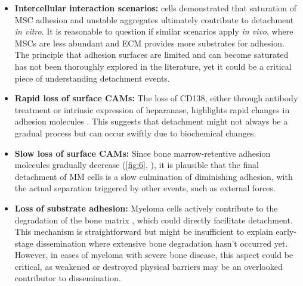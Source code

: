 \begin{itemize}

      \item\textbf{Intercellular interaction scenarios:} \INA cells demonstrated
            that saturation of MSC adhesion and unstable aggregates ultimately
            contribute to detachment \textit{in vitro}. It is reasonable to
            question if similar scenarios apply \textit{in vivo}, where MSCs are
            less abundant and ECM provides more substrates for adhesion. The
            principle that adhesion surfaces are limited and can become
            saturated has not been thoroughly explored in the literature, yet it
            could be a critical piece of understanding detachment events.

      \item\textbf{Rapid loss of surface \acp{CAM}:} The loss of CD138, either
            through antibody treatment or intrinsic expression of heparanase,
            highlights rapid changes in adhesion molecules
            \cite{yangHeparanasePromotesSpontaneous2005,
                  akhmetzyanovaDynamicCD138Surface2020}. This suggests that detachment
            might not always be a gradual process but can occur swiftly due to
            biochemical changes.

      \item\textbf{Slow loss of surface \acp{CAM}:} Since bone marrow-retentive
            adhesion molecules gradually decrease (\autoref{fig:6},
            ), it is plausible that the final detachment of MM
            cells is a slow culmination of diminishing adhesion, with the actual
            separation triggered by other events, such as external forces.

      \item\textbf{Loss of substrate adhesion:} Myeloma cells actively
            contribute to the degradation of the bone matrix
            \cite{terposPathogenesisBoneDisease2018}, which could directly
            facilitate detachment. This mechanism is straightforward but might
            be insufficient to explain early-stage dissemination where extensive
            bone degradation hasn't occurred yet. However, in cases of myeloma with
            severe bone disease, this aspect could be critical, as weakened
            or destroyed physical barriers may be an overlooked contributor to
            dissemination.


\end{itemize}
